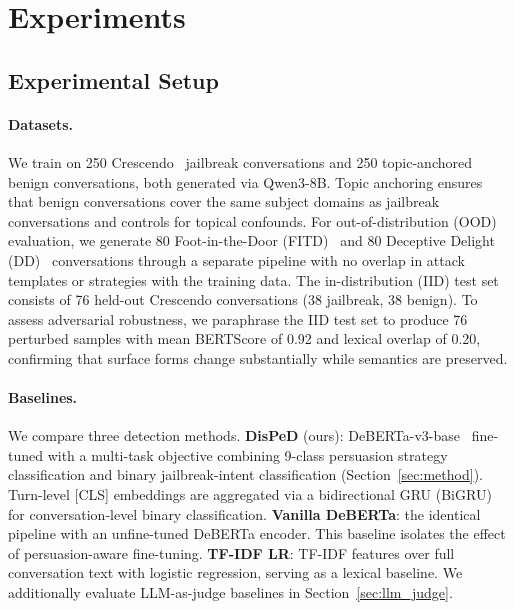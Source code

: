
\section{Experiments}
\label{sec:experiments}

\subsection{Experimental Setup}
\label{sec:setup}

\paragraph{Datasets.}
We train on 250 Crescendo~\citep{russinovich2024crescendo} jailbreak conversations and 250 topic-anchored benign conversations, both generated via Qwen3-8B.
Topic anchoring ensures that benign conversations cover the same subject domains as jailbreak conversations and controls for topical confounds.
For out-of-distribution (OOD) evaluation, we generate 80 Foot-in-the-Door (FITD)~\citep{fitd2024} and 80 Deceptive Delight (DD)~\citep{deceptivedelight2024} conversations through a separate pipeline with no overlap in attack templates or strategies with the training data.
The in-distribution (IID) test set consists of 76 held-out Crescendo conversations (38 jailbreak, 38 benign).
To assess adversarial robustness, we paraphrase the IID test set to produce 76 perturbed samples with mean BERTScore of 0.92 and lexical overlap of 0.20, confirming that surface forms change substantially while semantics are preserved.

\paragraph{Baselines.}
We compare three detection methods.
\textbf{DisPeD} (ours): DeBERTa-v3-base~\citep{he2021deberta} fine-tuned with a multi-task objective combining 9-class persuasion strategy classification and binary jailbreak-intent classification (Section~\ref{sec:method}).
Turn-level [CLS] embeddings are aggregated via a bidirectional GRU (BiGRU) for conversation-level binary classification.
\textbf{Vanilla DeBERTa}: the identical pipeline with an unfine-tuned DeBERTa encoder.
This baseline isolates the effect of persuasion-aware fine-tuning.
\textbf{TF-IDF LR}: TF-IDF features over full conversation text with logistic regression, serving as a lexical baseline.
We additionally evaluate LLM-as-judge baselines in Section~\ref{sec:llm_judge}.

